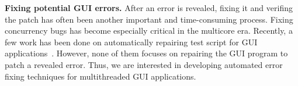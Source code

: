 \textbf{Fixing potential GUI errors.} After an error is revealed, fixing
it and verifing the patch has often been another important and time-consuming process. Fixing concurrency
bugs has become especially critical in the multicore era.
Recently, a few work has been done
on automatically repairing test script for GUI applications~\cite{Daniel:2011:AGR:2002931.2002937, Huang:2010:RGT:1828417.1828465}. However, none of them focuses on repairing
the GUI program to patch a revealed error. Thus, we are interested in 
developing automated error fixing techniques for
multithreaded GUI applications.

